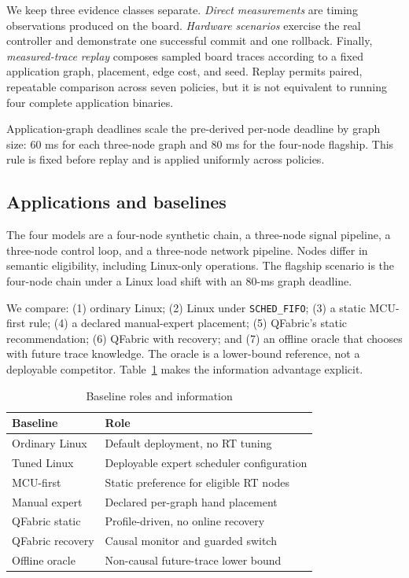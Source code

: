 \documentclass[conference]{IEEEtran}
\newcommand{\system}{QFabric\xspace}
\begin{document}
We keep three evidence classes separate. \emph{Direct measurements} are timing
observations produced on the board. \emph{Hardware scenarios} exercise the real
controller and demonstrate one successful commit and one rollback. Finally,
\emph{measured-trace replay} composes sampled board traces according to a fixed
application graph, placement, edge cost, and seed. Replay permits paired,
repeatable comparison across seven policies, but it is not equivalent to
running four complete application binaries.

Application-graph deadlines scale the pre-derived per-node deadline by graph
size: 60 ms for each three-node graph and 80 ms for the four-node flagship.
This rule is fixed before replay and is applied uniformly across policies.

\subsection{Applications and baselines}
The four models are a four-node synthetic chain, a three-node signal pipeline,
a three-node control loop, and a three-node network pipeline. Nodes differ in
semantic eligibility, including Linux-only operations. The flagship scenario
is the four-node chain under a Linux load shift with an 80-ms graph deadline.

We compare: (1) ordinary Linux; (2) Linux under \texttt{SCHED\_FIFO}; (3) a
static MCU-first rule; (4) a declared manual-expert placement; (5) \system's
static recommendation; (6) \system with recovery; and (7) an offline oracle
that chooses with future trace knowledge. The oracle is a lower-bound reference,
not a deployable competitor. Table~\ref{tab:baselines} makes the information
advantage explicit.

\begin{table}[t]
\caption{Baseline roles and information}
\label{tab:baselines}
\centering
\small
\begin{tabular}{lp{3.8cm}}
\toprule
Baseline & Role \\
\midrule
Ordinary Linux & Default deployment, no RT tuning \\
Tuned Linux & Deployable expert scheduler configuration \\
MCU-first & Static preference for eligible RT nodes \\
Manual expert & Declared per-graph hand placement \\
\system static & Profile-driven, no online recovery \\
\system recovery & Causal monitor and guarded switch \\
Offline oracle & Non-causal future-trace lower bound \\
\bottomrule
\end{tabular}
\end{table}
\end{document}
